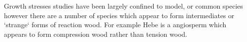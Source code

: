 Growth stresses studies have been largely confined to model, or common species
however there are a number of species which appear to form intermediates or
`strange` forms of reaction wood. For example Hebe is a angiosperm which appears
to form compression wood rather than tension wood.
